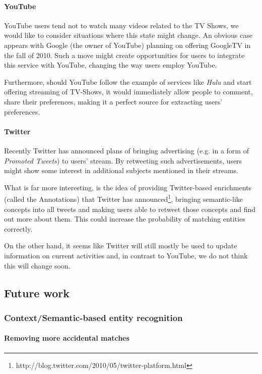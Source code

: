 \paragraph{YouTube}

YouTube users tend not to watch many videos related to the TV Shows, we would
like to consider situations where this state might change. An obvious case
appears with Google (the owner of YouTube) planning on offering GoogleTV in the
fall of 2010. Such a move might create opportunities for users to integrate
this service with YouTube, changing the way users employ YouTube.

Furthermore, should YouTube follow the example of services like \textit{Hulu}
and start offering streaming of TV-Shows, it would immediately allow people to
comment, share their preferences, making it a perfect source for extracting
users' preferences.

\paragraph{Twitter}

Recently Twitter has announced plans of bringing advertising (e.g. in a form of
\textit{Promoted Tweets}) to users' stream.  By retweeting such advertisements,
users might show some interest in additional subjects mentioned in their
streams.

What is far more interesting, is the idea of providing Twitter-based
enrichments (called the Annotations) that Twitter has announced\footnote{http://blog.twitter.com/2010/05/twitter-platform.html},
bringing semantic-like concepts into all tweets and making users able to
retweet those concepts and find out more about them. This could increase
the probability of matching entities correctly.

On the other hand, it seems like Twitter will still mostly be used to update
information on current activities and, in contrast to YouTube, we do not think
this will change soon.

\subsection{Future work}

\subsubsection{Context/Semantic-based entity recognition}

\paragraph{Removing more accidental matches}

